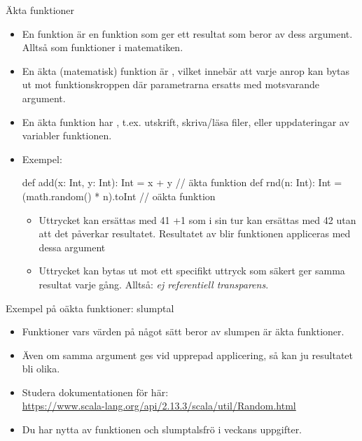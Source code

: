 
\begin{Slide}{Äkta funktioner}
\begin{itemize}\SlideFontSmall
\item En   funktion är en funktion som ger ett resultat som  beror av dess argument. Alltså som funktioner i matematiken.
\item En äkta (matematisk) funktion är  , vilket innebär att varje anrop kan bytas ut mot funktionskroppen där parametrarna ersatts med motsvarande argument.
\item En äkta funktion har , t.ex. utskrift, skriva/läsa filer,  eller uppdateringar av variabler  funktionen.
\item Exempel:
\begin{Code}
def add(x: Int, y: Int): Int = x + y              // äkta funktion
def rnd(n: Int): Int = (math.random() * n).toInt  // oäkta funktion
\end{Code} 
\begin{itemize}\SlideFontTiny

\item Uttrycket  kan ersättas med 41 +1 som i sin tur kan ersättas med 42 utan att det påverkar resultatet. Resultatet av  blir  funktionen appliceras med dessa argument
\item Uttrycket  kan  bytas ut mot ett specifikt uttryck som säkert ger samma resultat varje gång. Alltså: \emph{ej referentiell transparens}.
\end{itemize}  
\end{itemize}  
\end{Slide}

\begin{Slide}{Exempel på oäkta funktioner: slumptal}

  \begin{itemize}
    \item Funktioner vars värden på något sätt beror av slumpen är  äkta funktioner.
    \item Även om samma argument ges vid upprepad applicering, så kan ju resultatet bli olika.
    \item Studera dokumentationen för  här:\\ \href{https://www.scala-lang.org/api/2.13.3/scala/util/Random.html}{\SlideFontSmall https://www.scala-lang.org/api/2.13.3/scala/util/Random.html}
    \item Du har nytta av funktionen  och slumptalsfrö  i veckans uppgifter.
  \end{itemize}

\end{Slide}

